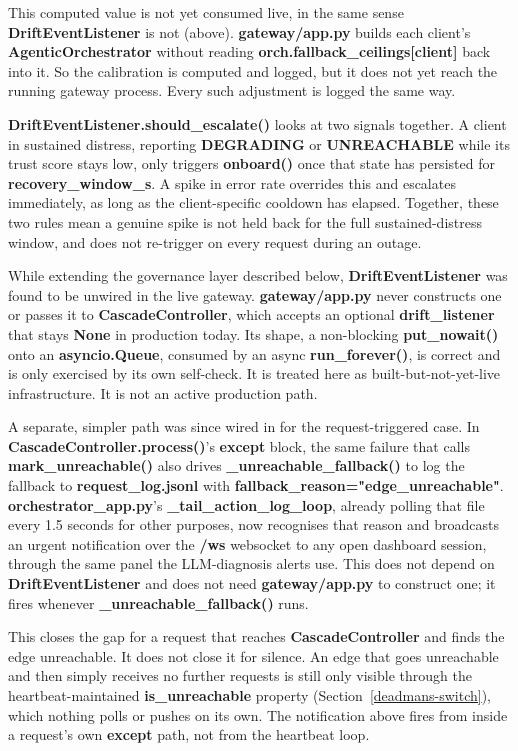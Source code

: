 This computed value is not yet consumed live, in the same sense
\textbf{DriftEventListener} is not (above). \textbf{gateway/app.py}
builds each client's \textbf{AgenticOrchestrator} without reading
\textbf{orch.fallback\_ceilings{[}client{]}} back into it. So the
calibration is computed and logged, but it does not yet reach the
running gateway process. Every such adjustment is logged the same way.

\textbf{DriftEventListener.should\_escalate()} looks at two signals
together. A client in sustained distress, reporting
\textbf{DEGRADING} or \textbf{UNREACHABLE} while its trust score stays
low, only triggers \textbf{onboard()} once that state has persisted for
\textbf{recovery\_window\_s}. A spike in error rate overrides this and
escalates immediately, as long as the client-specific cooldown has
elapsed. Together, these two rules mean a genuine spike is not held
back for the full sustained-distress window, and does not re-trigger on
every request during an outage.

While extending the governance layer described below,
\textbf{DriftEventListener} was found to be unwired in the live
gateway. \textbf{gateway/app.py} never constructs one or passes it to
\textbf{CascadeController}, which accepts an optional
\textbf{drift\_listener} that stays \textbf{None} in production today.
Its shape, a non-blocking \textbf{put\_nowait()} onto an
\textbf{asyncio.Queue}, consumed by an async \textbf{run\_forever()}, is
correct and is only exercised by its own self-check. It is treated here
as built-but-not-yet-live infrastructure. It is not an active
production path.

A separate, simpler path was since wired in for the request-triggered
case. In \textbf{CascadeController.process()}'s \textbf{except} block,
the same failure that calls \textbf{mark\_unreachable()} also drives
\textbf{\_unreachable\_fallback()} to log the fallback to
\textbf{request\_log.jsonl} with
\textbf{fallback\_reason="edge\_unreachable"}.
\textbf{orchestrator\_app.py}'s \textbf{\_tail\_action\_log\_loop},
already polling that file every 1.5 seconds for other purposes, now
recognises that reason and broadcasts an urgent notification over the
\textbf{/ws} websocket to any open dashboard session, through the same
panel the LLM-diagnosis alerts use. This does not depend on
\textbf{DriftEventListener} and does not need \textbf{gateway/app.py}
to construct one; it fires whenever \textbf{\_unreachable\_fallback()}
runs.

This closes the gap for a request that reaches
\textbf{CascadeController} and finds the edge unreachable. It does not
close it for silence. An edge that goes unreachable and then simply
receives no further requests is still only visible through the
heartbeat-maintained \textbf{is\_unreachable} property
(Section~\ref{deadmans-switch}), which nothing polls or pushes on its
own. The notification above fires from inside a request's own
\textbf{except} path, not from the heartbeat loop.

